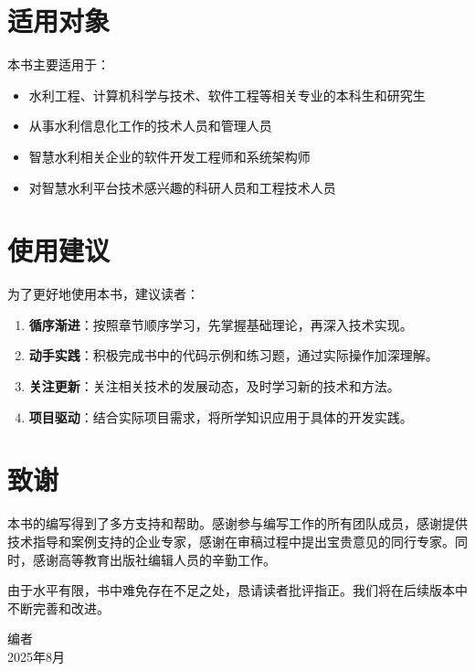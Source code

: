 \section*{适用对象}

本书主要适用于：

\begin{itemize}
\item 水利工程、计算机科学与技术、软件工程等相关专业的本科生和研究生
\item 从事水利信息化工作的技术人员和管理人员
\item 智慧水利相关企业的软件开发工程师和系统架构师
\item 对智慧水利平台技术感兴趣的科研人员和工程技术人员
\end{itemize}

\section*{使用建议}

为了更好地使用本书，建议读者：

\begin{enumerate}
\item \textbf{循序渐进}：按照章节顺序学习，先掌握基础理论，再深入技术实现。

\item \textbf{动手实践}：积极完成书中的代码示例和练习题，通过实际操作加深理解。

\item \textbf{关注更新}：关注相关技术的发展动态，及时学习新的技术和方法。

\item \textbf{项目驱动}：结合实际项目需求，将所学知识应用于具体的开发实践。
\end{enumerate}

\section*{致谢}

本书的编写得到了多方支持和帮助。感谢参与编写工作的所有团队成员，感谢提供技术指导和案例支持的企业专家，感谢在审稿过程中提出宝贵意见的同行专家。同时，感谢高等教育出版社编辑人员的辛勤工作。

由于水平有限，书中难免存在不足之处，恳请读者批评指正。我们将在后续版本中不断完善和改进。

\vspace{1cm}

\begin{flushright}
编\quad 者 \\
2025年8月
\end{flushright}
